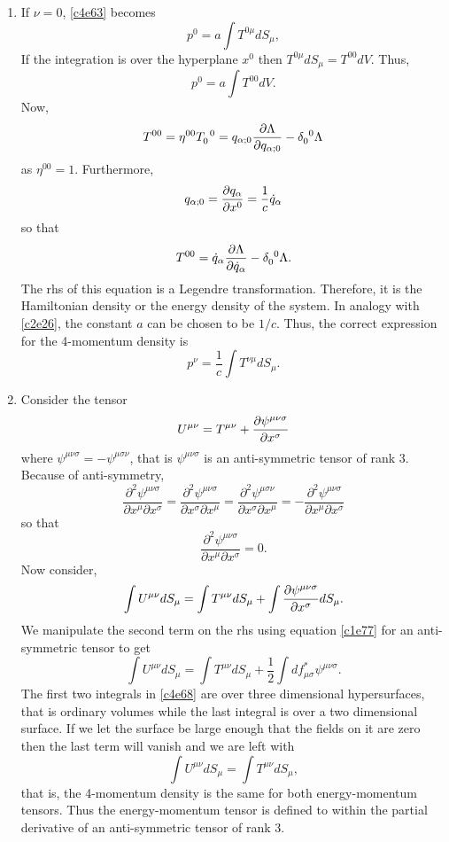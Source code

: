 \begin{enumerate}
\item If $\nu = 0$, \eqref{c4e63} becomes
\[
p^0 = a\int T^{0\mu}dS_\mu,
\]
If the integration is over the hyperplane $x^0$ then $T^{0\mu}dS_\mu = 
T^{00}dV$. Thus,
\[
p^0 = a\int T^{00}dV.
\]
Now, 
\[
T^{00} = \eta^{00}\tensor{T}{_0^0} = q_{\alpha;0}\pdt{\Lambda}{q_{\alpha;0}} - 
\tensor{\delta}{_0^0} \Lambda
\]
as $\eta^{00} = 1$. Furthermore, 
\[
q_{\alpha; 0} = \frac{\partial{q_\alpha}}{\partial{x^0}} = \frac{1}{c}\dot{q}_\alpha
\]
so that
\[
T^{00} = \dot{q}_\alpha\pdt{\Lambda}{\dot{q}_\alpha} - 
\tensor{\delta}{_0^0} \Lambda.
\]
The rhs of this equation is a Legendre transformation. Therefore, it is the
Hamiltonian density or the energy density of the system. In analogy with 
\eqref{c2e26}, the constant $a$ can be chosen to be $1/c$. Thus, the correct 
expression for the 4-momentum density is
\begin{equation}\label{c4e64}
p^\nu = \frac{1}{c}\int T^{\nu\mu}dS_\mu.
\end{equation}

\item Consider the tensor
\begin{equation}\label{c4e65}
U^{\mu\nu} = T^{\mu\nu} + \frac{\partial{\psi^{\mu\nu\sigma}}}{\partial{x^\sigma}}
\end{equation}
where $\psi^{\mu\nu\sigma}=-\psi^{\mu\sigma\nu}$, that is $\psi^{\mu\nu\sigma}$
is an anti-symmetric tensor of rank 3. Because of anti-symmetry,
\[
\frac{\partial^2\psi^{\mu\nu\sigma}}{\partial x^\mu \partial x^\sigma} = 
\frac{\partial^2\psi^{\mu\nu\sigma}}{\partial x^\sigma \partial x^\mu} = 
\frac{\partial^2\psi^{\mu\sigma\nu}}{\partial x^\sigma \partial x^\mu} = 
-\frac{\partial^2\psi^{\mu\nu\sigma}}{\partial x^\mu \partial x^\sigma}
\]
so that
\begin{equation}\label{c4e66}
\frac{\partial^2\psi^{\mu\nu\sigma}}{\partial x^\mu \partial x^\sigma} = 0.
\end{equation}
Now consider,
\begin{equation}\label{c4e67}
\int U^{\mu\nu} dS_\mu = \int T^{\mu\nu} dS_\mu + 
\int\frac{\partial{\psi^{\mu\nu\sigma}}}{\partial{x^\sigma}} dS_\mu.
\end{equation}
We manipulate the second term on the rhs using equation \eqref{c1e77} for an 
anti-symmetric tensor to get
\begin{equation}\label{c4e68}
\int U^{\mu\nu} dS_\mu = \int T^{\mu\nu} dS_\mu + 
\frac{1}{2}\int df^\ast_{\mu\sigma}\psi^{\mu\nu\sigma}.
\end{equation}
The first two integrals in \eqref{c4e68} are over three dimensional 
hypersurfaces, that is ordinary volumes while the last integral is over a two 
dimensional surface. If we let the surface be large enough that the fields on 
it are zero then the last term will vanish and we are left with
\begin{equation}\label{c4e69}
\int U^{\mu\nu} dS_\mu = \int T^{\mu\nu} dS_\mu,
\end{equation}
that is, the 4-momentum density is the same for both energy-momentum tensors. 
Thus the energy-momentum tensor is defined to within the partial derivative of 
an anti-symmetric tensor of rank 3.


\end{enumerate}
